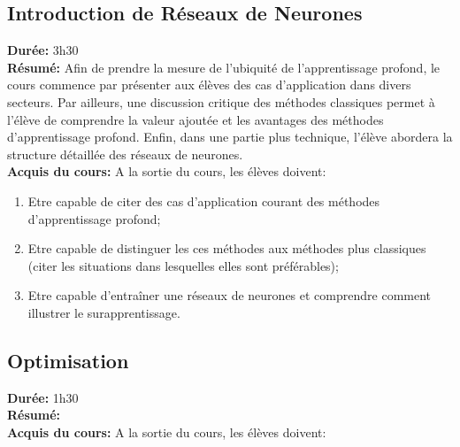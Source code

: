 \documentclass[12pt,a4paper]{article}
\begin{document}
\subsection{Introduction de Réseaux de Neurones}

\textbf{Durée:} 3h30\\
\textbf{Résumé:} Afin de prendre la mesure de l’ubiquité de l’apprentissage profond, le cours commence par présenter aux élèves des cas d’application dans divers secteurs. Par ailleurs, une discussion critique des méthodes classiques permet à l’élève de comprendre la valeur ajoutée et les avantages des méthodes d’apprentissage profond. Enfin, dans une partie plus technique, l’élève abordera la structure détaillée des réseaux de neurones. \\
\textbf{Acquis du cours:} A la sortie du cours, les élèves doivent:
\begin{enumerate}
\item Etre capable de citer des cas d’application courant des méthodes d’apprentissage profond; 
\item Etre capable de distinguer les ces méthodes aux méthodes plus classiques (citer les situations dans lesquelles elles sont préférables);
\item Etre capable d'entraîner une réseaux de neurones et comprendre comment illustrer le surapprentissage.
\end{enumerate}

\subsection{Optimisation}

\textbf{Durée:} 1h30\\
\textbf{Résumé:}  \\
\textbf{Acquis du cours:} A la sortie du cours, les élèves doivent:
\end{document}

